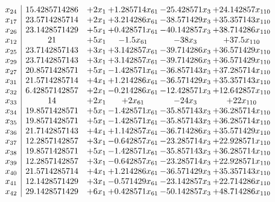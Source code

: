 \documentclass[11pt]{article}
\begin{document}
\[\begin{array}{c| c c@{\hskip 2pt} c@{\hskip 2pt} c@{\hskip 2pt} c@{\hskip 2pt} }
 x_{24}   &  15.4285714286 & + 2 x_{1} & + 1.285714 x_{61} & -25.428571 x_{3} & + 24.142857 x_{110}\\
 x_{17}   &  23.5714285714 & + 2 x_{1} & + 3.214286 x_{61} & -38.571429 x_{3} & + 35.357143 x_{110}\\
 x_{26}   &  23.1428571429 & + 5 x_{1} & + 0.428571 x_{61} & -40.142857 x_{3} & + 38.714286 x_{110}\\
 x_{12}   &  21 & + 5 x_{1} & -1.5 x_{61} & -38 x_{3} & + 37.5 x_{110}\\
 x_{25}   &  23.7142857143 & + 3 x_{1} & + 3.142857 x_{61} & -39.714286 x_{3} & + 36.571429 x_{110}\\
 x_{29}   &  23.7142857143 & + 3 x_{1} & + 3.142857 x_{61} & -39.714286 x_{3} & + 36.571429 x_{110}\\
 x_{27}   &  20.8571428571 & + 5 x_{1} & -1.428571 x_{61} & -36.857143 x_{3} & + 37.285714 x_{110}\\
 x_{31}   &  21.5714285714 & + 4 x_{1} & + 1.214286 x_{61} & -36.571429 x_{3} & + 35.357143 x_{110}\\
 x_{32}   &  6.42857142857 & + 2 x_{1} & -0.214286 x_{61} & -12.428571 x_{3} & + 12.642857 x_{110}\\
 x_{33}   &  14 & + 2 x_{1} & + 2 x_{61} & -24 x_{3} & + 22 x_{110}\\
 x_{34}   &  19.8571428571 & + 5 x_{1} & -1.428571 x_{61} & -35.857143 x_{3} & + 36.285714 x_{110}\\
 x_{35}   &  19.8571428571 & + 5 x_{1} & -1.428571 x_{61} & -35.857143 x_{3} & + 36.285714 x_{110}\\
 x_{36}   &  21.7142857143 & + 4 x_{1} & + 1.142857 x_{61} & -36.714286 x_{3} & + 35.571429 x_{110}\\
 x_{37}   &  12.2857142857 & + 3 x_{1} & -0.642857 x_{61} & -23.285714 x_{3} & + 22.928571 x_{110}\\
 x_{38}   &  19.8571428571 & + 5 x_{1} & -1.428571 x_{61} & -35.857143 x_{3} & + 36.285714 x_{110}\\
 x_{39}   &  12.2857142857 & + 3 x_{1} & -0.642857 x_{61} & -23.285714 x_{3} & + 22.928571 x_{110}\\
 x_{40}   &  21.5714285714 & + 4 x_{1} & + 1.214286 x_{61} & -36.571429 x_{3} & + 35.357143 x_{110}\\
 x_{41}   &  12.1428571429 & + 3 x_{1} & -0.571429 x_{61} & -23.142857 x_{3} & + 22.714286 x_{110}\\
 x_{42}   &  29.1428571429 & + 6 x_{1} & + 0.428571 x_{61} & -50.142857 x_{3} & + 48.714286 x_{110}\\

\end{array}\]
\end{document}
